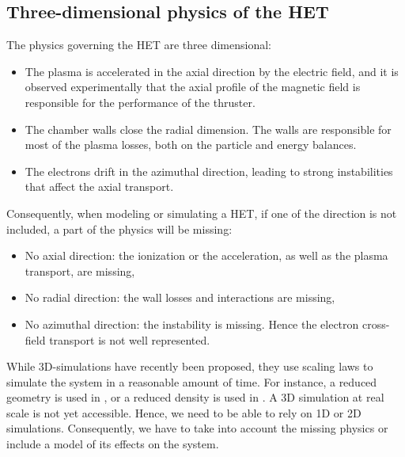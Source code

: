 \subsection*{Three-dimensional physics of the HET}
\label{sec-3Dphi}

The physics governing the \ac{HET} are three dimensional\string:
\begin{itemize}
  \item The plasma is accelerated in the axial direction by the electric field, and it is observed experimentally that the axial profile of the magnetic field is responsible for the performance of the thruster.
  \item The chamber walls close the radial dimension. The walls are responsible for most of the plasma losses, both on the particle and energy balances.
  \item The electrons drift in the azimuthal direction, leading to strong instabilities that affect the axial transport.
\end{itemize}

Consequently, when modeling or simulating a \ac{HET}, if one of the direction is not included, a part of the physics will be missing\string:
\begin{itemize}
  \item No axial direction\string: the ionization or the acceleration, as well as the plasma transport, are missing,
  \item No radial direction\string: the wall losses and interactions are missing,
  \item No azimuthal direction\string: the instability is missing. Hence the electron cross-field transport is not well represented.
\end{itemize}

While \ac{3D}-simulations have recently been proposed, they use scaling laws to simulate the system in a reasonable amount of time\citep{taccogna2019a}.
For instance, a reduced geometry is used in \citet{taccogna2018}, or a reduced density is used in \citet{fubiani2018a}.
A \ac{3D} simulation at real scale is not yet accessible.
Hence, we need to be able to rely on \ac{1D} or \ac{2D} simulations.
Consequently, we have to take into account the missing physics or include a model of its effects on the system.
